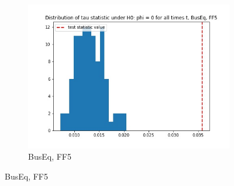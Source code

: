 \documentclass{article}
\begin{document}
\begin{figure}
\begin{subfigure}[b]{0.3\textwidth}
    \includegraphics[width=\textwidth]{BusEq/tau_hist_02_FF5.jpg}
    \caption{BusEq, FF5}
    \label{fig:2}
  \end{subfigure}
  \end{figure}
  
\end{document}
